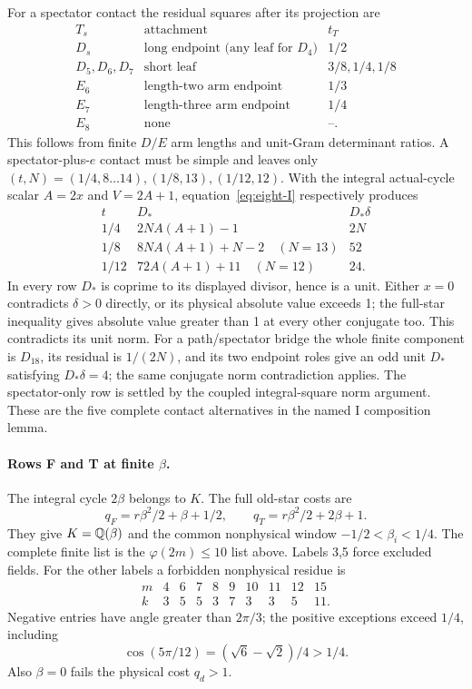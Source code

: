 For a spectator contact the residual squares after its projection are
\[
\begin{array}{c|c|c}
T_s&\text{attachment}&t_T\\\hline
D_s&\text{long endpoint (any leaf for }D_4)&1/2\\
D_5,D_6,D_7&\text{short leaf}&3/8,1/4,1/8\\
E_6&\text{length-two arm endpoint}&1/3\\
E_7&\text{length-three arm endpoint}&1/4\\
E_8&\text{none}&\text{--}.
\end{array}
\]
This follows from finite $D/E$ arm lengths and unit-Gram determinant
ratios. A spectator-plus-$e$ contact must be simple and leaves only
$(t,N)=(1/4,8\ldots14),(1/8,13),(1/12,12)$.
With the integral actual-cycle scalar $A=2x$ and $V=2A+1$,
equation~\eqref{eq:eight-I} respectively produces
\[
\begin{array}{c|c|c}
t& D_*&D_*\delta\\\hline
1/4&2NA(A+1)-1&2N\\
1/8&8NA(A+1)+N-2\quad(N=13)&52\\
1/12&72A(A+1)+11\quad(N=12)&24.
\end{array}
\]
In every row $D_*$ is coprime to its displayed divisor, hence is a
unit. Either $x=0$ contradicts $\delta>0$ directly, or its physical
absolute value exceeds 1; the full-star inequality gives absolute
value greater than 1 at every other conjugate too. This contradicts
its unit norm. For a path/spectator bridge the whole finite component
is $D_{18}$, its residual is $1/(2N)$, and its two endpoint roles
give an odd unit $D_*$ satisfying $D_*\delta=4$; the same conjugate
norm contradiction applies. The spectator-only row is settled by
the coupled integral-square norm argument. These are the five
complete contact alternatives in the named I composition lemma.

\paragraph{Rows F and T at finite $\beta$.}
The integral cycle $2\beta$ belongs to $K$. The full old-star costs are
\[
 q_F=r\beta^2/2+\beta+1/2,\qquad
 q_T=r\beta^2/2+2\beta+1.
\]
They give $K=\mathbb Q(\beta)$ and the common nonphysical window
$-1/2<\beta_i<1/4$. The complete finite list is the
$\varphi(2m)\le10$ list above. Labels 3,5 force excluded fields.
For the other labels a forbidden nonphysical residue is
\[
\begin{array}{c|rrrrrrrrr}
m&4&6&7&8&9&10&11&12&15\\
k&3&5&5&3&7&3&3&5&11.
\end{array}
\]
Negative entries have angle greater than $2\pi/3$; the positive
exceptions exceed $1/4$, including
\[
 \cos(5\pi/12)=(\sqrt6-\sqrt2)/4>1/4.
\]
Also $\beta=0$ fails the physical cost $q_d>1$.

